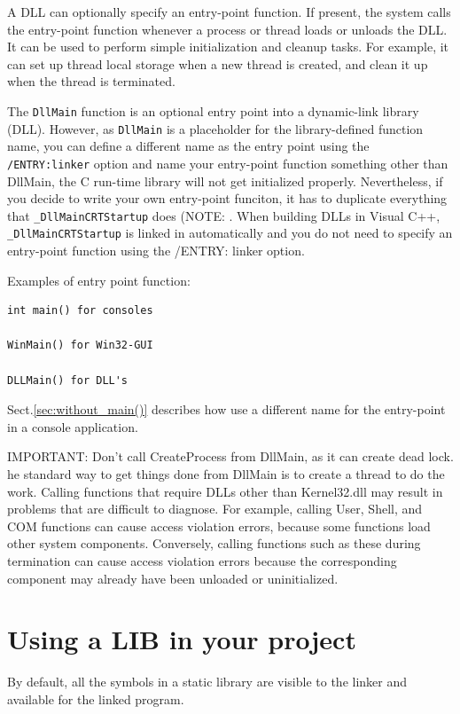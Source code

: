 A DLL can optionally specify an entry-point function. If present, the system
calls the entry-point function whenever a process or thread loads or unloads the
DLL. It can be used to perform simple initialization and cleanup tasks. For
example, it can set up thread local storage when a new thread is created, and
clean it up when the thread is terminated.

The \verb!DllMain! function is an optional entry point into a dynamic-link
library (DLL). However, as \verb!DllMain! is a placeholder for the
library-defined function name, you can define a different name as the entry
point using the \verb!/ENTRY:linker! option and name your entry-point function
something other than DllMain, the C run-time library will not get initialized
properly. Nevertheless, if you decide to write your own entry-point funciton, it
has to duplicate everything that \verb!_DllMainCRTStartup! does
(NOTE: 
.
When building DLLs in Visual C++, \verb!_DllMainCRTStartup! is linked in automatically
and you do not need to specify an entry-point function using the /ENTRY: linker
option.


Examples of entry point function:
\begin{verbatim}
int main() for consoles

WinMain() for Win32-GUI

DLLMain() for DLL's
\end{verbatim}
Sect.\ref{sec:without_main()} describes how use a different name for the entry-point in a console application.

IMPORTANT:  Don't call CreateProcess from DllMain, as it can create dead lock.
he standard way to get things done from DllMain is to create a thread to do the
work.
Calling functions that require DLLs other than Kernel32.dll may result in
problems that are difficult to diagnose.
For example, calling User, Shell, and COM functions can cause access violation
errors, because some functions load other system components.
 Conversely, calling functions such as these during termination can cause access
 violation errors because the corresponding component may already have been
 unloaded or uninitialized.

\section{Using a LIB in your project}

By default, all the symbols in a static library are visible to the linker and available for the linked program. 

